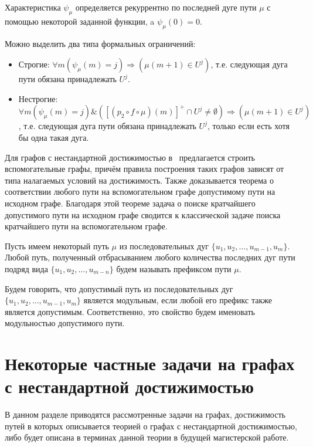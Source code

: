 	Характеристика $\psi_\mu$ определяется рекуррентно по последней дуге пути $\mu$ с помощью некоторой заданной функции, a $\psi_\mu(0) = 0$.
	
	Можно выделить два типа формальных ограничений:
	\begin{itemize}
		\item Строгие: $\forall m (\psi_\mu(m) = j) \Longrightarrow (\mu(m+1) \in U^j) $, т.е. следующая дуга пути обязана принадлежать $U^j$.
		\item Нестрогие: $\forall m (\psi_\mu(m) = j) \& ([(p_2 \circ f \circ \mu)(m)]^+ \cap U^j \neq \emptyset) \Longrightarrow (\mu(m+1) \in U^j) $, т.е. следующая дуга пути обязана принадлежать $U^j$, только если есть хотя бы одна такая дуга.
	\end{itemize}
	
	Для графов с нестандартной достижимостью в~\autocite{Mono} предлагается строить вспомогательные графы, причём правила построения таких графов зависят от типа налагаемых условий на достижимость. 
	Также доказывается теорема о соответствии любого пути на вспомогательном графе допустимому пути на исходном графе. Благодаря этой теореме задача о поиске кратчайшего допустимого пути на исходном графе сводится к классической задаче поиска кратчайшего пути на вспомогательном графе.
	
	\begin{mydefinition}
		Пусть имеем некоторый путь $\mu$ из последовательных дуг $\{u_1, u_2, ... , u_{m-1}, u_m\}$. Любой путь, полученный отбрасыванием любого количества последних дуг пути подряд вида $\{u_1, u_2, ... , u_{m-n} \}$ будем называть префиксом пути $\mu$.
	\end{mydefinition}
	
	\begin{mydefinition}
		Будем говорить, что допустимый путь из последовательных дуг $\{u_1, u_2, ... , u_{m-1}, u_m\}$ является модульным, если любой его префикс также является допустимым. Соответственно, это свойство будем именовать модульностью допустимого пути. 
	\end{mydefinition}
	
	\section{Некоторые частные задачи на графах с нестандартной достижимостью}
	
	В данном разделе приводятся рассмотренные задачи на графах, достижимость путей в которых описывается теорией о графах с нестандартной достижимостью, либо будет описана в терминах данной теории в будущей магистерской работе. 
	
